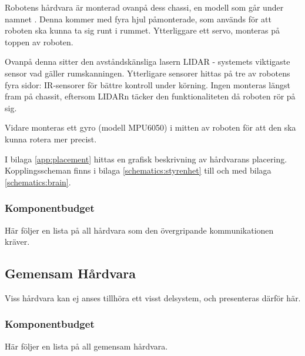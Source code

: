 \documentclass[a4paper,11pt]{article}
\begin{document}
\noindent
Robotens hårdvara är monterad ovanpå dess chassi, en modell som går under namnet \cite{terminator}. Denna kommer med fyra hjul påmonterade, som används för att roboten ska kunna ta sig runt i rummet. Ytterliggare ett servo, monteras på toppen av roboten.

Ovanpå denna sitter den avståndskänsliga lasern LIDAR - systemets viktigaste sensor vad gäller rumskanningen. Ytterligare sensorer hittas på tre av robotens fyra sidor: IR-sensorer för bättre kontroll under körning. Ingen monteras längst fram på chassit, eftersom LIDARn täcker den funktionaliteten då roboten rör på sig.

Vidare monteras ett gyro (modell MPU6050) i mitten av roboten för att den ska kunna rotera mer precist.

I bilaga \ref{app:placement} hittas en grafisk beskrivning av hårdvarans placering. Kopplingsscheman finns i bilaga \ref{schematics:styrenhet} till och med bilaga \ref{schematics:brain}.



\clearpage

\subsubsection{Komponentbudget}
Här följer en lista på all hårdvara som den övergripande kommunikationen kräver.

\begin{center}
\begin{HardwareList}
\end{HardwareList}
\end{center}

\subsection{Gemensam Hårdvara}
Viss hårdvara kan ej anses tillhöra ett visst delsystem, och presenteras därför här.

\subsubsection{Komponentbudget}
Här följer en lista på all gemensam hårdvara.

\begin{center}
\begin{HardwareList}
\end{HardwareList}
\end{center}
\end{document}
